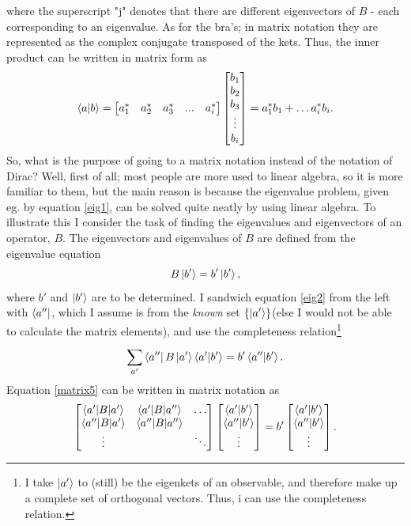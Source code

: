 where the superscript "j" denotes that there are different eigenvectors of $B$ - each corresponding to an eigenvalue. As for the bra's; in matrix notation they are represented as the complex conjugate transposed of the kets. Thus, the inner product can be written in matrix form as 
\begin{equation}
	\braket{a|b}=\begin{bmatrix}a_1^* & a_2^* & a_3^* &...& a_i^* \end{bmatrix}\begin{bmatrix}b_1\\ b_2\\ b_3\\ \vdots  \\b_i\end{bmatrix}=a_1^*b_1+\dots a_i^*b_i.
\end{equation} 
So, what is the purpose of going to a matrix notation instead of the notation of Dirac? Well, first of all; most people are more used to linear algebra, so it is more familiar to them, but the main reason is because the eigenvalue problem, given eg. by equation \eqref{eig1}, can be solved quite neatly by using linear algebra. To illustrate this I consider the task of finding the eigenvalues and eigenvectors of an operator, $B$. The eigenvectors and eigenvalues of $B$ are defined from the eigenvalue equation
\begin{equation}
	B\ket{b'}=b'\ket{b'},
	\label{eig2}
\end{equation} 
where $b'$ and $\ket{b'}$ are to be determined. I sandwich equation \eqref{eig2} from the left with $\bra{a''}$, which I assume is from the \emph{known} set $\{\ket{a'}\}$(else I would not be able to calculate the matrix elements), and use the completeness relation\footnote{I take $\ket{a'}$ to (still) be the eigenkets of an observable, and therefore make up a complete set of orthogonal vectors. Thus, i can use the completeness relation.}
\begin{equation}	\sum_{a'}^{}\bra{a''}B\ket{a'}\braket{a'|b'}=b'\braket{a''|b'}.
	\label{matrix5}	
\end{equation} 
Equation \eqref{matrix5} can be written in matrix notation as
\begin{equation}
	\begin{bmatrix}
		\braket{a'|B|a'} & \braket{a'|B|a''}&\dots\\
		\braket{a''|B|a'} & \braket{a''|B|a''} &\\
		\vdots& & \ddots \\
	\end{bmatrix}
	\begin{bmatrix}
		\braket{a'|b'}\\
		\braket{a''|b'}\\
		\vdots\\
	\end{bmatrix}
	=b'\begin{bmatrix}
		\braket{a'|b'}\\
		\braket{a''|b'}\\
		\vdots\\
	\end{bmatrix}.
	\label{matrixeig1}
\end{equation}  
